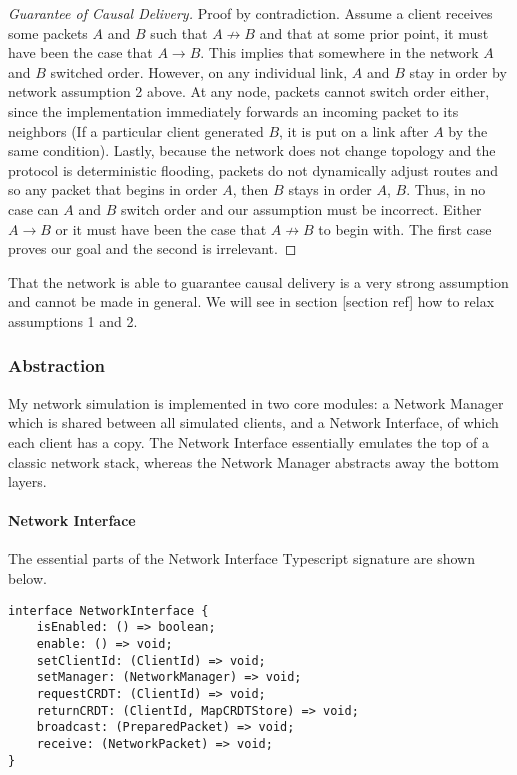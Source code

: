 \documentclass[12pt,a4paper,twoside,openright]{report}
\begin{document}
		\begin{proof}[Guarantee of Causal Delivery]
			Proof by contradiction. Assume a client receives some packets $A$ and $B$ such that $A \not\rightarrow B$ and that at some prior point, it must have been the case that $A \rightarrow B$. This implies that somewhere in the network $A$ and $B$ switched order. However, on any individual link, $A$ and $B$ stay in order by network assumption 2 above. At any node, packets cannot switch order either, since the implementation immediately forwards an incoming packet to its neighbors (If a particular client generated $B$, it is put on a link after $A$ by the same condition). Lastly, because the network does not change topology and the protocol is deterministic flooding, packets do not dynamically adjust routes and so any packet that begins in order $A$, then $B$ stays in order $A$, $B$. Thus, in no case can $A$ and $B$ switch order and our assumption must be incorrect. Either $A \rightarrow B$ or it must have been the case that $A \not\rightarrow B$ to begin with. The first case proves our goal and the second is irrelevant.
		\end{proof}
		
		That the network is able to guarantee causal delivery is a very strong assumption and cannot be made in general. We will see in section [section ref] how to relax assumptions 1 and 2.
		
		\subsubsection{Abstraction}
		My network simulation is implemented in two core modules: a Network Manager which is shared between all simulated clients, and a Network Interface, of which each client has a copy. The Network Interface essentially emulates the top of a classic network stack, whereas the Network Manager abstracts away the bottom layers.
		
		\paragraph{Network Interface} The essential parts of the Network Interface Typescript signature are shown below.
		
\begin{lstlisting}[caption=NetworkInterface Type Signature (cleaned)]
interface NetworkInterface {
	isEnabled: () => boolean;
	enable: () => void;
	setClientId: (ClientId) => void;
	setManager: (NetworkManager) => void;
	requestCRDT: (ClientId) => void;
	returnCRDT: (ClientId, MapCRDTStore) => void;
	broadcast: (PreparedPacket) => void;
	receive: (NetworkPacket) => void;
}
\end{lstlisting}
\end{document}
